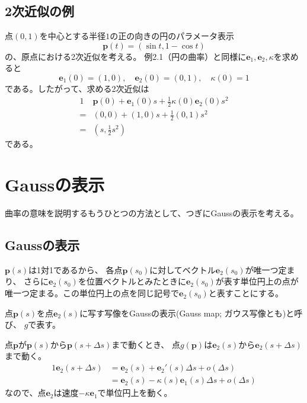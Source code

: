 \documentclass[a4j,disablejfam,dvipdfmx,papersize,slide,uplatex,21pt]{jsarticle}
\begin{document}
\subsection*{2次近似の例}
点$(0, 1)$を中心とする半径$1$の正の向きの円のパラメータ表示
\begin{equation}
    \bm{p}(t) = \left(\sin t, 1 - \cos t\right)
\end{equation}
の、原点における2次近似を考える。
例2.1（円の曲率）と同様に$\bm{e}_1, \bm{e}_2, \kappa$を求めると
\begin{equation}
    \bm{e}_1(0) = (1, 0),\quad
    \bm{e}_2(0) = (0, 1),\quad
    \kappa(0) = 1
\end{equation}
である。したがって、求める2次近似は
\begin{alignat}{1}
      &\bm{p}(0) + \bm{e}_1(0) s + \frac{1}{2} \kappa(0) \bm{e}_2(0) s^2 \\
    = &(0, 0) + (1, 0) s + \frac{1}{2} (0, 1) s^2 \\
    = &\left(s, \frac{1}{2} s^2\right)
\end{alignat}
である。




\section{Gaussの表示}
曲率の意味を説明するもうひとつの方法として、つぎにGaussの表示を考える。

\newpage
\subsection*{Gaussの表示}
$\bm{p}(s)$は1対1であるから、
各点$\bm{p}(s_0)$に対してベクトル$\bm{e}_2(s_0)$が唯一つ定まり、
さらに$\bm{e}_2(s_0)$を位置ベクトルとみたときに$\bm{e}_2(s_0)$が表す単位円上の点が
唯一つ定まる。この単位円上の点を同じ記号で$\bm{e}_2(s_0)$と表すことにする。

点$\bm{p}(s)$を点$\bm{e}_2(s)$に写す写像をGaussの表示(Gauss map; ガウス写像とも)と呼び、
$g$で表す。

\newpage
点$\bm{p}$が$\bm{p}(s)$から$\bm{p}(s + \Delta s)$まで動くとき、
点$g(\bm{p})$は$\bm{e}_2(s)$から$\bm{e}_2(s + \Delta s)$まで動く。
\begin{alignat}{1}
    \bm{e}_2(s + \Delta s)
        &= \bm{e}_2(s) + \bm{e}_2'(s) \Delta s + o(\Delta s) \\
        &= \bm{e}_2(s) - \kappa(s) \bm{e}_1(s) \Delta s + o(\Delta s)
\end{alignat}
なので、点$\bm{e}_2$は速度$-\kappa\bm{e}_1$で単位円上を動く。
\end{document}
